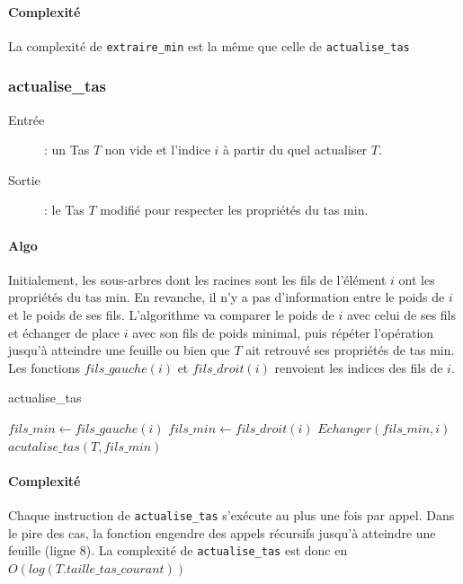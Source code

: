 \documentclass[a4paper,11pt]{article}
\begin{document}
\paragraph*{Complexité}
La complexité de \texttt{extraire\_min} est la même que celle de \texttt{actualise\_tas}
\subsubsection*{actualise\_tas}
\begin{description}
\item[Entrée] : un \textsf{Tas} $T$ non vide et l'indice $i$ à partir du quel actualiser $T$.
\item[Sortie] : le \textsf{Tas} $T$ modifié pour respecter les propriétés du tas min.
\end{description}
\paragraph*{Algo}
Initialement, les sous-arbres dont les racines sont les fils de l'élément $i$ ont les propriétés du tas min. En revanche, il n'y a pas d'information entre le poids de $i$ et le poids de ses fils. L'algorithme va comparer le poids de $i$ avec celui de ses fils et échanger de place $i$ avec son fils de poids minimal, puis répéter l'opération jusqu'à atteindre une feuille ou bien que $T$ ait retrouvé ses propriétés de tas min.\\
Les fonctions $fils\_gauche(i)$ et $fils\_droit(i)$ renvoient les indices des fils de $i$.
\begin{algorithm}[h!]
\caption{actualise\_tas}
\begin{algorithmic}[1]
\STATE $fils\_min \leftarrow fils\_gauche(i)$
\ELSE
\STATE $fils\_min \leftarrow fils\_droit(i)$
\ENDIF
{}
\STATE $Echanger(fils\_min, i)$
\STATE $acutalise\_tas(T, fils\_min)$
\ENDIF
\ENDIF
\end{algorithmic}
\end{algorithm}
\paragraph*{Complexité}
Chaque instruction de \texttt{actualise\_tas} s'exécute au plus une fois par appel. Dans le pire des cas, la fonction engendre des appels récursifs jusqu'à atteindre une feuille (ligne 8). La complexité de \texttt{actualise\_tas} est donc en $O(log(T.taille\_tas\_courant))$
\end{document}
